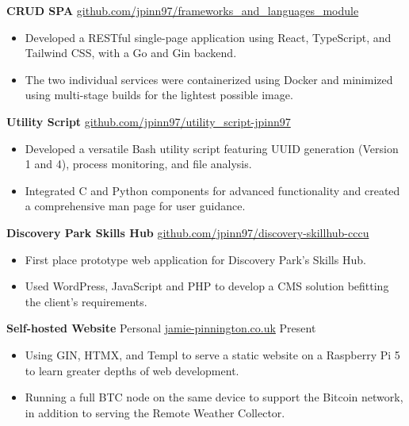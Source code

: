 \documentclass[11pt,letterpaper]{article}
\begin{document}
\textbf{CRUD SPA} \hfill \href{https://github.com/jpinn97/frameworks\_and\_languages\_module}{github.com/jpinn97/frameworks\_and\_languages\_module} \\
\vspace{-10pt}
\begin{itemize}
  \item Developed a RESTful single-page application using React, TypeScript, and Tailwind CSS, with a Go and Gin backend.
  \item The two individual services were containerized using Docker and minimized using multi-stage builds for the lightest possible image.
\end{itemize}

\textbf{Utility Script} \hfill \href{https://github.com/jpinn97/utility\_script-jpinn97}{github.com/jpinn97/utility\_script-jpinn97} \\
\vspace{-10pt}
\begin{itemize}
  \item Developed a versatile Bash utility script featuring UUID generation (Version 1 and 4), process monitoring, and file analysis.
  \item Integrated C and Python components for advanced functionality and created a comprehensive man page for user guidance.
\end{itemize}

\textbf{Discovery Park Skills Hub} \hfill \href{https://github.com/jpinn97/discovery-skillhub-cccu}{github.com/jpinn97/discovery-skillhub-cccu} \\
\vspace{-10pt}
\begin{itemize}
  \item First place prototype web application for Discovery Park's Skills Hub.
  \item Used WordPress, JavaScript and PHP to develop a CMS solution befitting the client's requirements.
\end{itemize}

\textbf{Self-hosted Website} Personal \hfill \href{https://jamie-pinnington.co.uk}{jamie-pinnington.co.uk} \hfill Present \\
\vspace{-10pt}
\begin{itemize}
  \item Using GIN, HTMX, and Templ to serve a static website on a Raspberry Pi 5 to learn greater depths of web development.
  \item Running a full BTC node on the same device to support the Bitcoin network, in addition to serving the Remote Weather Collector.
\end{itemize}
\end{document}
